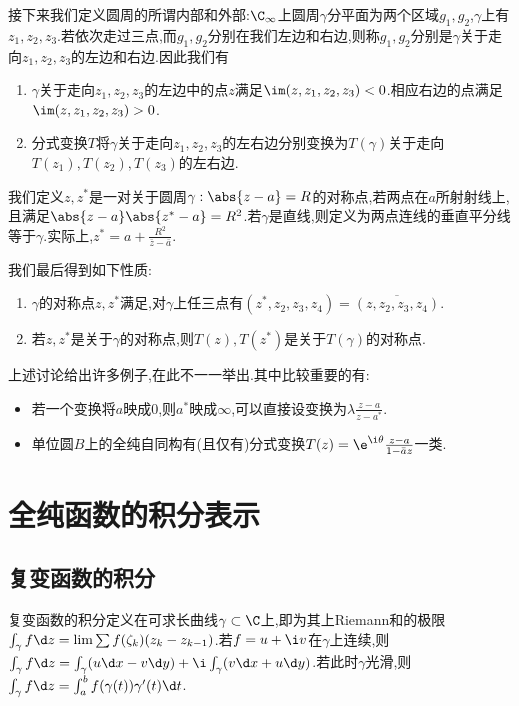 \documentclass{article}
\begin{document}
接下来我们定义圆周的所谓内部和外部:$\C_\infty$上圆周$\gamma$分平面为两个区域$g_1,g_2$,$\gamma$上有$z_1,z_2,z_3$.若依次走过三点,而$g_1,g_2$分别在我们左边和右边,则称$g_1,g_2$分别是$\gamma$关于走向$z_1,z_2,z_3$的左边和右边.因此我们有

\begin{enumerate}[resume]
    \item $\gamma$关于走向$z_1,z_2,z_3$的左边中的点$z$满足$\im(z,z_1,z_2,z_3)<0$.相应右边的点满足$\im(z,z_1,z_2,z_3)>0$.
    \item 分式变换$T$将$\gamma$关于走向$z_1,z_2,z_3$的左右边分别变换为$T(\gamma)$关于走向$T(z_1),T(z_2),T(z_3)$的左右边.
\end{enumerate}

我们定义$z,z^*$是一对关于圆周$\gamma:\abs{z-a}=R$的对称点,若两点在$a$所射射线上,且满足$\abs{z-a}\abs{z^*-a}=R^2$.若$\gamma$是直线,则定义为两点连线的垂直平分线等于$\gamma$.实际上,$z^*=a+\frac{R^2}{\bar{z}-\bar{a}}$.

我们最后得到如下性质:
\begin{enumerate}[resume]
    \item $\gamma$的对称点$z,z^*$满足,对$\gamma$上任三点有$(z^*,z_2,z_3,z_4)=\overline{(z,z_2,z_3,z_4)}$.
    \item 若$z,z^*$是关于$\gamma$的对称点,则$T(z),T(z^*)$是关于$T(\gamma)$的对称点.
\end{enumerate}

上述讨论给出许多例子,在此不一一举出.其中比较重要的有:

\begin{itemize}
    \item 若一个变换将$a$映成$0$,则$a^*$映成$\infty$,可以直接设变换为$\lambda\frac{z-a}{z-a^*}$.
    \item 单位圆$B$上的全纯自同构有(且仅有)分式变换$T(z)=\e^{\i \theta}\frac{z-a}{1-\bar{a}z}$一类.
\end{itemize}

\section{全纯函数的积分表示}
\subsection{复变函数的积分}
复变函数的积分定义在可求长曲线$\gamma\subset\C$上,即为其上Riemann和的极限$\int_\gamma f\d z=\lim\sum f(\zeta_k)(z_k-z_{k-1})$.若$f=u+\i v$在$\gamma$上连续,则$\int_\gamma f\d z=\int_\gamma (u\d x-v\d y)+\i\int_\gamma (v\d x+u\d y)$.若此时$\gamma$光滑,则$\int_\gamma f\d z=\int_{a}^{b}f(\gamma(t))\gamma'(t)\d t$.
\end{document}
